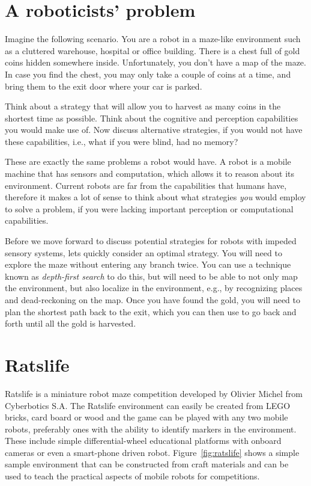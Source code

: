 \section{A roboticists' problem}
Imagine the following scenario. You are a robot in a maze-like environment such as a cluttered warehouse, hospital or office building. There is a chest full of gold coins hidden somewhere inside. Unfortunately, you don't have a map of the maze. In case you find the chest, you may only take a couple of coins at a time, and bring them to the exit door where your car is parked.

\begin{framed}
Think about a strategy that will allow you to harvest as many coins in the shortest time as possible. Think about the cognitive and perception capabilities you would make use of. Now discuss alternative strategies, if you would not have these capabilities, i.e., what if you were blind, had no memory?
\end{framed}

These are exactly the same problems a robot would have. A robot is a mobile machine that has sensors and computation, which allows it to reason about its environment. Current robots are far from the capabilities that humans have, therefore it makes a lot of sense to think about what strategies \emph{you} would employ to solve a problem, if you were lacking important perception or computational capabilities.

Before we move forward to discuss potential strategies for robots with impeded sensory systems, lets quickly consider an optimal strategy. You will need to explore the maze without entering any branch twice. You can use a technique known as \emph{depth-first search} to do this, but will need to be able to not only map the environment, but also localize in the environment, e.g., by recognizing places and dead-reckoning on the map. Once you have found the gold, you will need to plan the shortest path back to the exit, which you can then use to go back and forth until all the gold is harvested.

\section{Ratslife}\label{sec:ratslife}
Ratslife is a miniature robot maze competition developed by Olivier Michel from Cyberbotics S.A. The Ratslife environment can easily be created from LEGO bricks, card board or wood and the game can be played with any two mobile robots, preferably ones with the ability to identify markers in the environment. These include simple differential-wheel educational platforms with onboard cameras or even a smart-phone driven robot. Figure~\ref{fig:ratslife} shows a simple sample environment that can be constructed from craft materials and can be used to teach the practical aspects of mobile robots for competitions.


